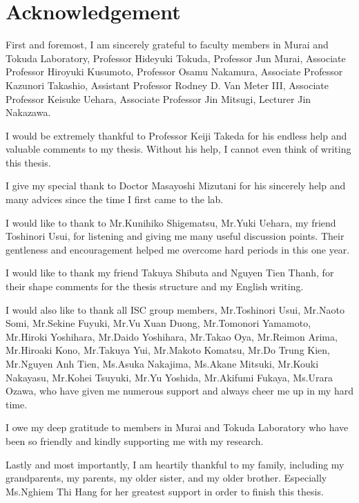 \section*{Acknowledgement}

First and foremost, I am sincerely grateful to faculty members in Murai and Tokuda Laboratory, Professor Hideyuki Tokuda, Professor Jun Murai, Associate Professor Hiroyuki Kusumoto, Professor Osamu Nakamura, Associate Professor Kazunori Takashio, Assistant Professor Rodney D. Van Meter III, Associate Professor Keisuke Uehara, Associate Professor Jin Mitsugi, Lecturer Jin Nakazawa.

I would be extremely thankful to Professor Keiji Takeda for his endless help and valuable comments to my thesis. Without his help, I cannot even think of writing this thesis.

I give my special thank to Doctor Masayoshi Mizutani for his sincerely help and many advices since the time I first came to the lab.

I would like to thank to Mr.Kunihiko Shigematsu, Mr.Yuki Uehara, my friend Toshinori Usui, for listening	and giving me many useful discussion points. Their gentleness and encouragement helped me overcome hard periods in this one year. 
 
I would like to thank my friend Takuya Shibuta and Nguyen Tien Thanh, for their shape comments for the thesis structure and my English writing.

I would also like to thank all ISC group members, Mr.Toshinori Usui, Mr.Naoto Somi, Mr.Sekine Fuyuki, Mr.Vu Xuan Duong, Mr.Tomonori Yamamoto, Mr.Hiroki Yoshihara, Mr.Daido Yoshihara, Mr.Takao Oya, Mr.Reimon Arima, Mr.Hiroaki Kono, Mr.Takuya Yui, Mr.Makoto Komatsu, Mr.Do Trung Kien, Mr.Nguyen Anh Tien, Ms.Asuka Nakajima, Ms.Akane Mitsuki, Mr.Kouki Nakayasu, Mr.Kohei Tsuyuki, Mr.Yu Yoshida, Mr.Akifumi Fukaya, Ms.Urara Ozawa, who have given me numerous support and always cheer me up in my hard time. 

I owe my deep gratitude to members in Murai and Tokuda Laboratory who have been so friendly and kindly supporting me with my research.

Lastly and most importantly, I am heartily thankful to my family, including my grandparents, my parents, my older sister, and my older brother. Especially Ms.Nghiem Thi Hang for her greatest support in order to finish this thesis.
